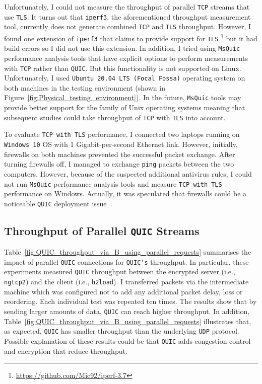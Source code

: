 \documentclass[12pt,a4paper]{report}
\begin{document}
Unfortunately, I could not measure the throughput of parallel \texttt{TCP} streams that use \texttt{TLS}.
It turns out that \texttt{iperf3}, the aforementioned throughput measurement tool, currently does not generate combined \texttt{TCP} and \texttt{TLS} throughput.
However, I found one extension of \texttt{iperf3} that claims to provide support for \texttt{TLS} \footnote{\url{https://github.com/Mic92/iperf-3.7}} but it had build errors so I did not use this extension.
In addition, I tried using \texttt{MsQuic} performance analysis tools that have explicit options to perform measurements with \texttt{TCP} rather than \texttt{QUIC}. 
But this functionality is not supported on Linux.
Unfortunately, I used \texttt{Ubuntu 20.04 LTS (Focal Fossa)} operating system on both machines in the testing environment (shown in Figure~\ref{fig:Physical_testing_environment}).
In the future, \texttt{MsQuic} tools may provide better support for the family of Unix operating systems meaning that subsequent studies could take throughput of \texttt{TCP} with \texttt{TLS} into account.

To evaluate \texttt{TCP with TLS} performance, I connected two laptops running on \texttt{Windows 10} OS with 1 Gigabit-per-second Ethernet link.
However, initially, firewalls on both machines prevented the successful packet exchange.
After turning firewalls off, I managed to exchange \texttt{ping} packets between the two computers.
However, because of the suspected additional antivirus rules, I could not run \texttt{MsQuic} performance analysis tools and measure \texttt{TCP with TLS} performance on Windows.
Actually, it was speculated that firewalls could be a noticeable \texttt{QUIC} deployment issue~\cite{The_QUIC_Transport_Protocol_Design_and_Internet-Scale_Deployment}.

\subsection{Throughput of Parallel \texttt{QUIC} Streams}

Table~\ref{fig:QUIC_throughput_via_B_using_parallel_requests} summarises the impact of  parallel \texttt{QUIC} connections for \texttt{QUIC's} throughput.
In particular, these experiments measured \texttt{QUIC} throughput between the encrypted server (i.e., \texttt{ngtcp2}) and the client (i.e., \texttt{h2load}).
I transferred packets via the intermediate machine which was configured not to add any additional packet delay, loss or reordering.
Each individual test was repeated ten times.
The results show that by sending larger amounts of data, \texttt{QUIC} can reach higher throughput.
In addition, Table~\ref{fig:QUIC_throughput_via_B_using_parallel_requests} illustrates that, as expected, \texttt{QUIC} has smaller throughput than the underlying \texttt{UDP} protocol.
Possible explanation of these results could be that \texttt{QUIC} adds congestion control and encryption that reduce throughput.
\end{document}
